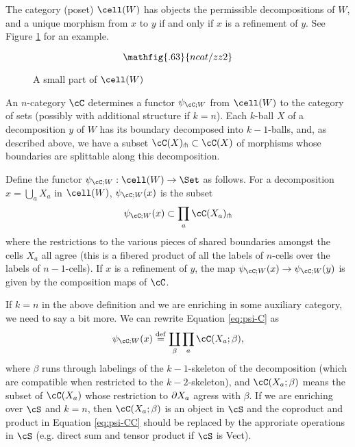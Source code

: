 \begin{defn}
The category (poset) $\cell(W)$ has objects the permissible decompositions of $W$, 
and a unique morphism from $x$ to $y$ if and only if $x$ is a refinement of $y$.
See Figure \ref{partofJfig} for an example.
\end{defn}

\begin{figure}[!ht]
\begin{equation*}
\mathfig{.63}{ncat/zz2}
\end{equation*}
\caption{A small part of $\cell(W)$}
\label{partofJfig}
\end{figure}

An $n$-category $\cC$ determines 
a functor $\psi_{\cC;W}$ from $\cell(W)$ to the category of sets 
(possibly with additional structure if $k=n$).
Each $k$-ball $X$ of a decomposition $y$ of $W$ has its boundary decomposed into $k{-}1$-balls,
and, as described above, we have a subset $\cC(X)\spl \sub \cC(X)$ of morphisms whose boundaries
are splittable along this decomposition.

\begin{defn}
Define the functor $\psi_{\cC;W} : \cell(W) \to \Set$ as follows.
For a decomposition $x = \bigcup_a X_a$ in $\cell(W)$, $\psi_{\cC;W}(x)$ is the subset
\begin{equation}
\label{eq:psi-C}
	\psi_{\cC;W}(x) \sub \prod_a \cC(X_a)\spl
\end{equation}
where the restrictions to the various pieces of shared boundaries amongst the cells
$X_a$ all agree (this is a fibered product of all the labels of $n$-cells over the labels of $n-1$-cells).
If $x$ is a refinement of $y$, the map $\psi_{\cC;W}(x) \to \psi_{\cC;W}(y)$ is given by the composition maps of $\cC$.
\end{defn}

If $k=n$ in the above definition and we are enriching in some auxiliary category, 
we need to say a bit more.
We can rewrite Equation \ref{eq:psi-C} as
\begin{equation} \label{eq:psi-CC}
	\psi_{\cC;W}(x) \deq \coprod_\beta \prod_a \cC(X_a; \beta) ,
\end{equation}
where $\beta$ runs through labelings of the $k{-}1$-skeleton of the decomposition
(which are compatible when restricted to the $k{-}2$-skeleton), and $\cC(X_a; \beta)$
means the subset of $\cC(X_a)$ whose restriction to $\partial X_a$ agress with $\beta$.
If we are enriching over $\cS$ and $k=n$, then $\cC(X_a; \beta)$ is an object in 
$\cS$ and the coproduct and product in Equation \ref{eq:psi-CC} should be replaced by the approriate
operations in $\cS$ (e.g. direct sum and tensor product if $\cS$ is Vect).

